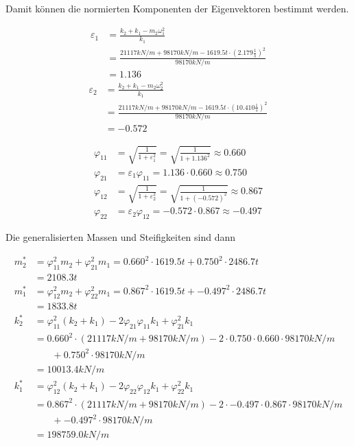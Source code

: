 Damit können die normierten Komponenten der Eigenvektoren bestimmt werden.

\begin{align*}
\varepsilon_1 &= \frac{k_2 + k_1 - m_2 \omega_1^2}{k_1} \\
              &= \frac{21117 kN/m + 98170 kN/m - 1619.5 t \cdot (2.179 \frac{1}{s})^2}{98170 kN/m}\\
              &= 1.136
\end{align*}
\begin{align*}
\varepsilon_2 &= \frac{k_2 + k_1 - m_2 \omega_2^2}{k_1} \\
              &= \frac{21117 kN/m + 98170 kN/m - 1619.5 t \cdot (10.410 \frac{1}{s})^2}{98170 kN/m}\\
              &= -0.572
\end{align*}

\begin{align*}
\varphi_{11} &= \sqrt{\frac{1}{1 + \varepsilon_1^2}} = \sqrt{\frac{1}{1 + 1.136^2}} \approx 0.660\\
\varphi_{21} &= \varepsilon_1 \varphi_{11} = 1.136 \cdot 0.660 \approx 0.750\\
\varphi_{12} &= \sqrt{\frac{1}{1 + \varepsilon_2^2}} = \sqrt{\frac{1}{1 + (-0.572)^2}} \approx 0.867\\
\varphi_{22} &= \varepsilon_2 \varphi_{12} = -0.572 \cdot 0.867 \approx -0.497
\end{align*}

\pagebreak

Die generalisierten Massen und Steifigkeiten sind dann

\begin{align*}
m_2^* &= \varphi_{11}^2 m_2 + \varphi_{21}^2 m_1 = 0.660^2 \cdot 1619.5 t + 0.750^2 \cdot 2486.7 t\\
      &= 2108.3 t\\[2em]
m_1^* &= \varphi_{12}^2 m_2 + \varphi_{22}^2 m_1 = 0.867^2 \cdot 1619.5 t + -0.497^2 \cdot 2486.7 t\\
      &= 1833.8 t\\[2em]
k_2^* &= \varphi_{11}^2 (k_2 + k_1) - 2 \varphi_{21} \varphi_{11} k_1 + \varphi_{21}^2 k_1\\
      &= 0.660^2 \cdot (21117 kN/m +  98170 kN/m) - 2 \cdot 0.750 \cdot 0.660 \cdot 98170 kN/m\\
      &\phantom{{}=1} + 0.750^2 \cdot  98170 kN/m\\
      &= 10013.4 kN/m\\[2em]
k_1^* &= \varphi_{12}^2 (k_2 + k_1) - 2 \varphi_{22} \varphi_{12} k_1 + \varphi_{22}^2 k_1\\
      &= 0.867^2 \cdot (21117 kN/m +  98170 kN/m) - 2 \cdot -0.497 \cdot 0.867 \cdot 98170 kN/m\\
      &\phantom{{}=1} + -0.497^2 \cdot 98170 kN/m\\
      &= 198759.0 kN/m
\end{align*}

